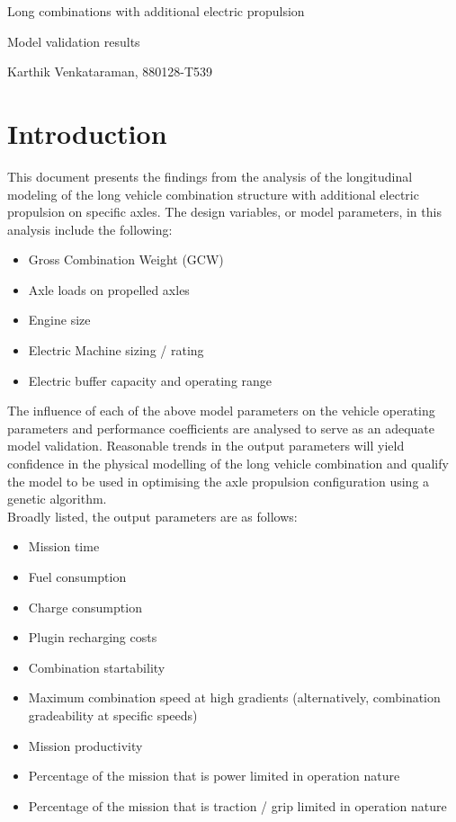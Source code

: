 \documentclass{article}
\begin{document}
\centerline{\sc \large Long combinations with additional electric propulsion}
\vspace{.5pc}
\centerline{\sc Model validation results}
\centerline{Karthik Venkataraman, 880128-T539}


\section{Introduction}
This document presents the findings from the analysis of the longitudinal modeling of the long vehicle combination structure with additional electric propulsion on specific axles. The design variables, or model parameters, in this analysis include the following:

\begin{itemize} 
\item Gross Combination Weight (GCW)
\item Axle loads on propelled axles
\item Engine size
\item Electric Machine sizing / rating
\item Electric buffer capacity and operating range
\end{itemize}

The influence of each of the above model parameters on the vehicle operating parameters and performance coefficients are analysed to serve as an adequate model validation. Reasonable trends in the output parameters will yield confidence in the physical modelling of the long vehicle combination and qualify the model to be used in optimising the axle propulsion configuration using a genetic algorithm.\\

Broadly listed, the output parameters are as follows:

\begin{itemize}
\item Mission time
\item Fuel consumption
\item Charge consumption
\item Plugin recharging costs
\item Combination startability
\item Maximum combination speed at high gradients (alternatively, combination gradeability at specific speeds)
\item Mission productivity
\item Percentage of the mission that is power limited in operation nature
\item Percentage of the mission that is traction / grip limited in operation nature
\end{itemize}
\end{document}
